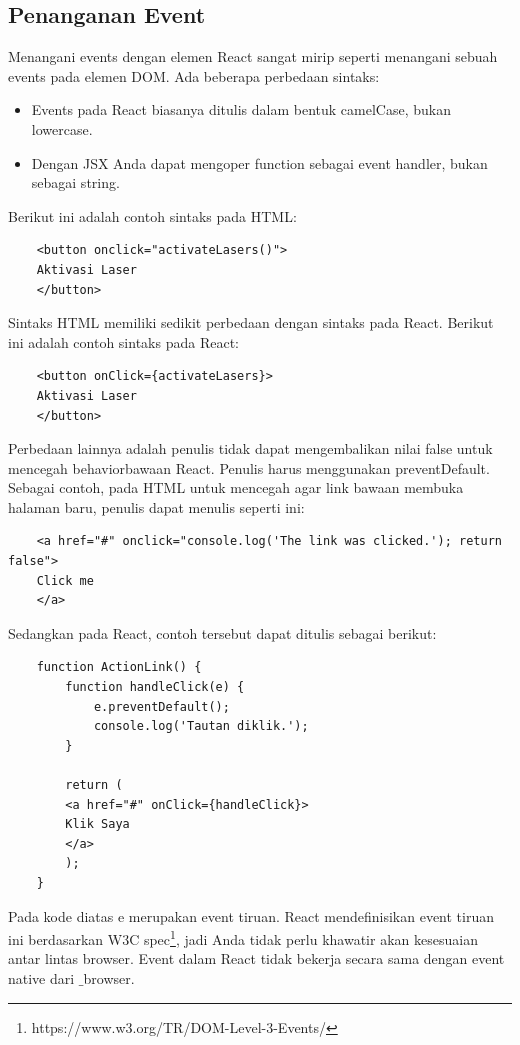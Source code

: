 

\subsection{Penanganan Event}
Menangani events dengan elemen React sangat mirip seperti menangani sebuah events pada elemen DOM. Ada beberapa perbedaan sintaks:
\begin{itemize}
	\item Events pada React biasanya ditulis dalam bentuk camelCase, bukan lowercase.
	\item Dengan JSX Anda dapat mengoper function sebagai event handler, bukan sebagai string.
\end{itemize}
Berikut ini adalah contoh sintaks pada HTML:
\begin{lstlisting}
	<button onclick="activateLasers()">
	Aktivasi Laser
	</button>
\end{lstlisting}
Sintaks HTML memiliki sedikit perbedaan dengan sintaks pada React. Berikut ini adalah contoh sintaks pada React:
\begin{lstlisting}
	<button onClick={activateLasers}>
	Aktivasi Laser
	</button>
\end{lstlisting} 
Perbedaan lainnya adalah penulis tidak dapat mengembalikan nilai false untuk mencegah behaviorbawaan React. Penulis harus menggunakan preventDefault. Sebagai contoh, pada HTML untuk mencegah agar link bawaan membuka halaman baru, penulis dapat menulis seperti ini:  
\begin{lstlisting}
	<a href="#" onclick="console.log('The link was clicked.'); return false">
	Click me
	</a>
\end{lstlisting}
Sedangkan pada React, contoh tersebut dapat ditulis sebagai berikut:
\begin{lstlisting}
	function ActionLink() {
		function handleClick(e) {
			e.preventDefault();
			console.log('Tautan diklik.');
		}
		
		return (
		<a href="#" onClick={handleClick}>
		Klik Saya
		</a>
		);
	}
\end{lstlisting}
Pada kode diatas e merupakan event tiruan. React mendefinisikan event tiruan ini berdasarkan W3C spec\footnote{https://www.w3.org/TR/DOM-Level-3-Events/}, jadi Anda tidak perlu khawatir akan kesesuaian antar lintas browser. Event dalam React tidak bekerja secara sama dengan event native dari $\_$browser.
